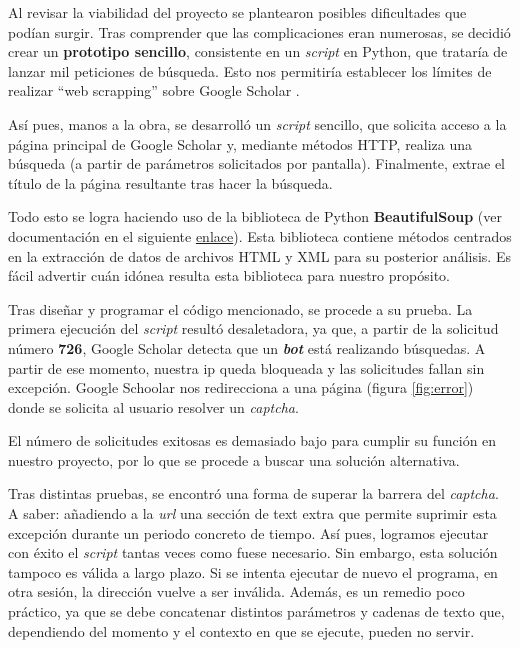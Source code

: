 
Al revisar la viabilidad del proyecto se plantearon posibles dificultades que podían surgir. Tras comprender que las complicaciones eran numerosas, se decidió crear un \textbf{prototipo sencillo}, consistente en un \textit{script} en Python, que trataría de lanzar  mil peticiones de búsqueda. Esto nos permitiría establecer los límites de realizar ``web scrapping'' sobre Google Scholar .

Así pues, manos a la obra, se desarrolló un \textit{script} sencillo, que solicita acceso a la página principal de Google Scholar y, mediante métodos HTTP, realiza una búsqueda (a partir de parámetros solicitados por pantalla). Finalmente, extrae el título de la página resultante tras hacer la búsqueda. 

Todo esto se logra haciendo uso de la biblioteca de Python \textbf{BeautifulSoup} (ver documentación en el siguiente \href{https://beautiful-soup-4.readthedocs.io/en/latest/}{enlace}). Esta biblioteca contiene métodos centrados en la extracción de datos de archivos HTML y XML para su posterior análisis. Es fácil advertir cuán idónea resulta esta biblioteca para nuestro propósito.

Tras diseñar y programar el código mencionado, se procede a su prueba. La primera ejecución del \textit{script} resultó desaletadora, ya que, a partir de la solicitud número \textbf{726}, Google Scholar detecta que un \textbf{\textit{bot}} está realizando búsquedas. A partir de ese momento, nuestra ip queda bloqueada y las solicitudes fallan sin excepción. Google Schoolar nos redirecciona a una página (figura \ref{fig:error}) donde se solicita al usuario resolver un \textit{captcha}. 


El número de solicitudes exitosas es demasiado bajo para cumplir su función en nuestro proyecto, por lo que se procede a buscar una solución alternativa. 

Tras distintas pruebas, se encontró una forma de superar la barrera del \textit{captcha}. A saber: añadiendo a la \textit{url} una sección de text extra que permite suprimir esta excepción durante un periodo concreto de tiempo. Así pues, logramos ejecutar con éxito el \textit{script} tantas veces como fuese necesario. Sin embargo, esta solución tampoco es válida a largo plazo. Si se intenta ejecutar de nuevo el programa, en otra sesión, la dirección vuelve a ser inválida. Además, es un remedio poco práctico, ya que se debe concatenar distintos parámetros y cadenas de texto que, dependiendo del momento y el contexto en que se ejecute, pueden no servir.

